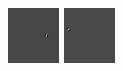 \begin{figure}[ht]
 \includegraphics[width=\textwidth*11/100]{ch5/figures/firstgabor_Scaling_2.png}
 \includegraphics[width=\textwidth*11/100]{ch5/figures/firstgabor_Scaling_3.png}

\end{figure}
